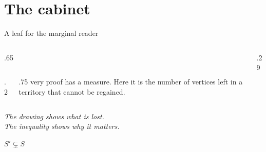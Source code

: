 \documentclass[aspectratio=169,11pt]{beamer}
\begin{document}
\section{The cabinet}
\begin{frame}{A leaf for the marginal reader}
  \begin{columns}[T,onlytextwidth]
    \begin{column}{.65\textwidth}
      \begin{columns}[T,onlytextwidth]
        \begin{column}{.2\textwidth}\end{column}
        \begin{column}{.75\textwidth}
          very proof has a measure. Here it is the number of vertices
          left in a territory that cannot be regained.
        \end{column}
      \end{columns}
      \bigskip
      {\large\itshape The drawing shows what is lost.\\
        The inequality shows why it matters.\par}
      \bigskip
      {\color{AtlasRubric}\LARGE $S'\subsetneq S$\par}
      \medskip\AtlasGrandFleuron[28mm]
    \end{column}
    \begin{column}{.29\textwidth}
    \end{column}
  \end{columns}
\end{frame}
\end{document}
